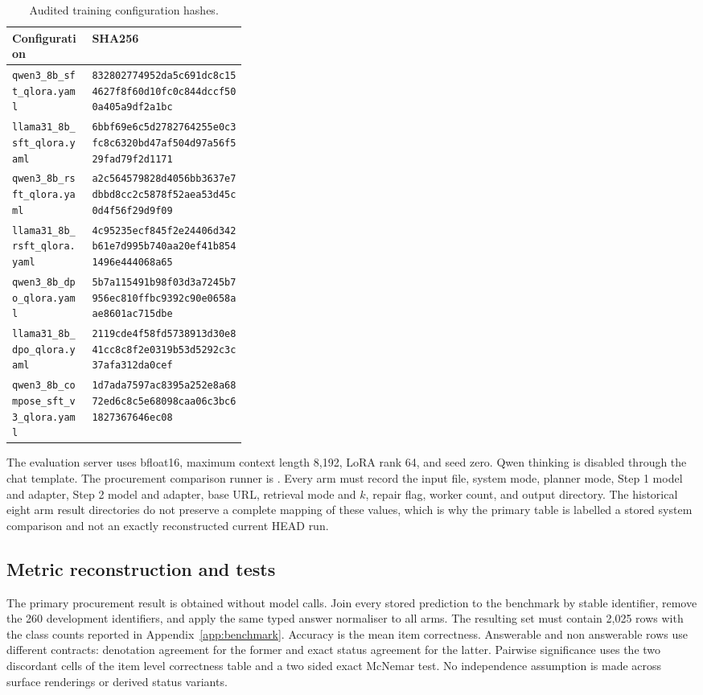 \documentclass{article}
\begin{document}
\begin{table}[h]
  \centering
  \caption{Audited training configuration hashes.}
  \label{tab:config-hashes}
  \scriptsize
  \begin{tabularx}{\linewidth}{p{0.34\linewidth}X}
    \toprule
    Configuration & SHA256 \\
    \midrule
    \texttt{qwen3\_8b\_sft\_qlora.yaml} & \nolinkurl{832802774952da5c691dc8c154627f8f60d10fc0c844dccf500a405a9df2a1bc} \\
    \texttt{llama31\_8b\_sft\_qlora.yaml} & \nolinkurl{6bbf69e6c5d2782764255e0c3fc8c6320bd47af504d97a56f529fad79f2d1171} \\
    \texttt{qwen3\_8b\_rsft\_qlora.yaml} & \nolinkurl{a2c564579828d4056bb3637e7dbbd8cc2c5878f52aea53d45c0d4f56f29d9f09} \\
    \texttt{llama31\_8b\_rsft\_qlora.yaml} & \nolinkurl{4c95235ecf845f2e24406d342b61e7d995b740aa20ef41b8541496e444068a65} \\
    \texttt{qwen3\_8b\_dpo\_qlora.yaml} & \nolinkurl{5b7a115491b98f03d3a7245b7956ec810ffbc9392c90e0658aae8601ac715dbe} \\
    \texttt{llama31\_8b\_dpo\_qlora.yaml} & \nolinkurl{2119cde4f58fd5738913d30e841cc8c8f2e0319b53d5292c3c37afa312da0cef} \\
    \texttt{qwen3\_8b\_compose\_sft\_v3\_qlora.yaml} & \nolinkurl{1d7ada7597ac8395a252e8a6872ed6c8c5e68098caa06c3bc61827367646ec08} \\
    \bottomrule
  \end{tabularx}
\end{table}

The evaluation server uses bfloat16, maximum context length 8,192, LoRA rank 64, and seed zero.
Qwen thinking is disabled through the chat template.  The procurement comparison runner is
.  Every arm must record the input file, system mode, planner mode,
Step 1 model and adapter, Step 2 model and adapter, base URL, retrieval mode and $k$, repair flag,
worker count, and output directory.  The historical eight arm result directories do not preserve a
complete mapping of these values, which is why the primary table is labelled a stored system
comparison and not an exactly reconstructed current HEAD run.

\subsection{Metric reconstruction and tests}

The primary procurement result is obtained without model calls.  Join every stored prediction to
the benchmark by stable identifier, remove the 260 development identifiers, and apply the same
typed answer normaliser to all arms.  The resulting set must contain 2,025 rows with the class counts
reported in Appendix~\ref{app:benchmark}.  Accuracy is the mean item correctness.  Answerable and
non answerable rows use different contracts: denotation agreement for the former and exact status
agreement for the latter.  Pairwise significance uses the two discordant cells of the item level
correctness table and a two sided exact McNemar test.  No independence assumption is made across
surface renderings or derived status variants.
\end{document}

